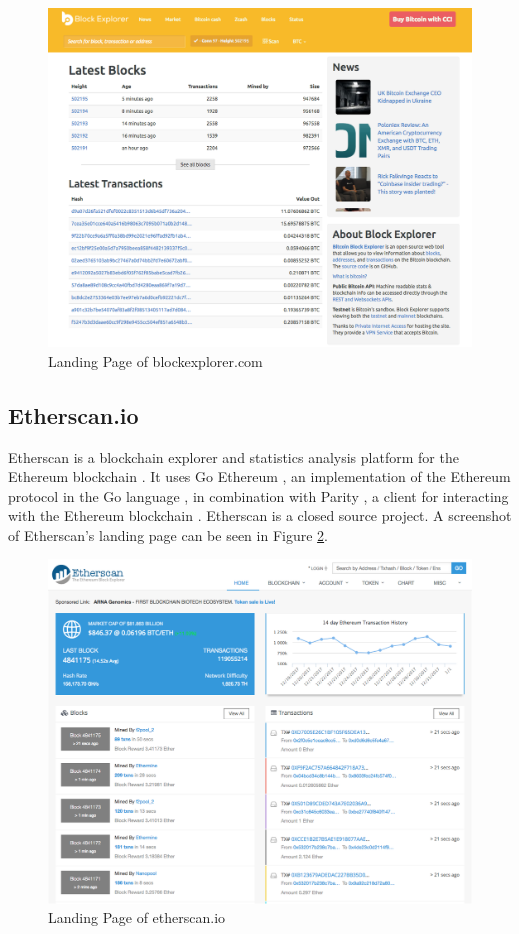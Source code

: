 \begin{figure}
  \includegraphics[width=\linewidth]{blockexplorer.png}
  \caption{Landing Page of blockexplorer.com \cite{blockexplorer}}
  \label{fig:blockexplorer1}
\end{figure}

\subsection{Etherscan.io \cite{etherscan}}
Etherscan is a blockchain explorer and statistics analysis platform for the Ethereum blockchain \cite{ethereum}. It uses Go Ethereum \cite{goethereum}, an implementation of the Ethereum protocol in the Go language \cite{golang}, in combination with Parity \cite{parity}, a client for interacting with the Ethereum blockchain \cite{ethereum}. Etherscan is a closed source project. A screenshot of Etherscan's landing page can be seen in Figure \ref{fig:etherscan1}.

\begin{figure}
  \includegraphics[width=\linewidth]{etherscan.png}
  \caption{Landing Page of etherscan.io \cite{etherscan}}
  \label{fig:etherscan1}
\end{figure}

